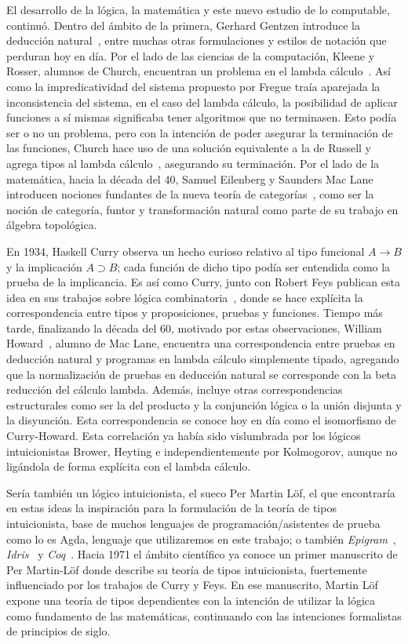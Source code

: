El desarrollo de la lógica, la matemática y este nuevo estudio de lo computable, continuó. Dentro del ámbito de la primera, Gerhard Gentzen introduce la deducción natural~, entre muchas otras formulaciones y estilos de notación que perduran hoy en día. Por el lado de las ciencias de la computación, Kleene y Rosser, alumnos de Church, encuentran un problema en el lambda cálculo~. Así como la impredicatividad del sistema propuesto por Fregue traía aparejada la inconsistencia del sistema, en el caso del lambda cálculo, la posibilidad de aplicar funciones a sí mismas significaba tener algoritmos que no terminasen. Esto podía ser o no un problema, pero con la intención de poder asegurar la terminación de las funciones, Church hace uso de una solución equivalente a la de Russell y agrega tipos al lambda cálculo~, asegurando su terminación. Por el lado de la matemática, hacia la década del 40, Samuel Eilenberg y Saunders Mac Lane introducen nociones fundantes de la nueva teoría de categorías~, como ser la noción de categoría, funtor y transformación natural como parte de su trabajo en álgebra topológica. 

En 1934, Haskell Curry observa un hecho curioso relativo al tipo funcional $A \to B$ y la implicación $A \supset B$; cada función de dicho tipo  podía ser entendida como la prueba de la implicancia. Es así como Curry, junto con Robert Feys publican esta idea en sus trabajos sobre lógica combinatoria~, donde se hace explícita la correspondencia entre tipos y proposiciones, pruebas y funciones. Tiempo más tarde, finalizando la década del 60, motivado por estas observaciones, William Howard~, alumno de Mac Lane, encuentra una correspondencia entre pruebas en deducción natural y programas en lambda cálculo simplemente tipado, agregando que la normalización de pruebas en deducción natural se corresponde con la beta reducción del cálculo lambda. Además, incluye otras correspondencias estructurales como ser la del producto y la conjunción lógica o la unión disjunta y la disyunción. Esta correspondencia se conoce hoy en día como el isomorfismo de Curry-Howard. Esta correlación ya había sido vislumbrada por los lógicos intuicionistas Brower, Heyting e independientemente por Kolmogorov, aunque no ligándola de forma explícita con el lambda cálculo.

Sería también un lógico intuicionista, el sueco Per Martin Löf, el que encontraría en estas ideas la inspiración para la formulación de la teoría de tipos intuicionista, base de muchos lenguajes de programación/asistentes de prueba como lo es Agda, lenguaje que utilizaremos en este trabajo; o también {\it Epigram}~\cite{mcbride:epigram}, {\it Idris}~\cite{brady:idris,idris} y {\it Coq}~\cite{coq}.
Hacia 1971 el ámbito científico ya conoce un primer manuscrito de Per Martin-Löf donde describe su teoría de tipos intuicionista, fuertemente influenciado por los trabajos de Curry y Feys. En ese manuscrito, Martin Löf expone una teoría de tipos dependientes con la intención de utilizar la lógica como fundamento de las matemáticas, continuando con las intenciones formalistas de principios de siglo.

